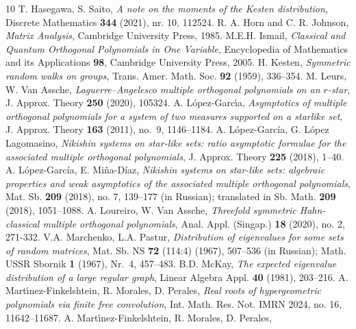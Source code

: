 \documentclass[12pt]{article}
\numberwithin{equation}{section}
\begin{document}
\begin{thebibliography}{10}
 T. Hasegawa, S. Saito,
\textit{A note on the moments of the Kesten distribution},
Discrete Mathematics \textbf{344} (2021), nr. 10, 112524.
 R. A. Horn  and C. R. Johnson, 
\textit{Matrix Analysis}, Cambridge University Press, 1985. 
 M.E.H. Ismail, \textit{Classical and Quantum Orthogonal Polynomials in One Variable},
Encyclopedia of Mathematics and its Applications \textbf{98}, Cambridge University Press,
2005.
 H. Kesten,
\textit{Symmetric random walks on groups},
Trans. Amer. Math. Soc. \textbf{92} (1959), 336--354.
 M. Leurs, W. Van Assche,
\textit{Laguerre--Angelesco multiple orthogonal polynomials on an $r$-star},
J. Approx. Theory \textbf{250} (2020), 105324.
 A. L\'opez-Garc\'\i a, 
\textit{Asymptotics of multiple orthogonal polynomials for a system of two measures supported on a starlike set}, 
J. Approx. Theory \textbf{163} (2011), no.~9, 1146--1184.
 A. L\'opez-Garc\'ia, G. L\'opez Lagomasino, 
\textit{Nikishin systems on star-like sets: ratio asymptotic formulae for the associated multiple orthogonal polynomials}, 
J. Approx. Theory \textbf{225} (2018), 1--40.
 A. L\'opez-Garc\'ia, E. Mi\~na-D\'iaz,
\textit{Nikishin systems on star-like sets: algebraic properties and weak asymptotics of the associated multiple orthogonal polynomials},
Mat. Sb.  \textbf{209}  (2018),  no. 7, 139--177 (in Russian);
translated in Sb. Math. \textbf{209} (2018), 1051--1088.
 A. Loureiro, W. Van Assche,
\textit{Threefold symmetric Hahn-classical multiple orthogonal polynomials}, Anal. Appl. (Singap.) \textbf{18} (2020), no. 2, 271-332.%
 V.A. Marchenko, L.A. Pastur,
\textit{Distribution of eigenvalues for some sets of random matrices},
Mat. Sb. NS \textbf{72} (114:4) (1967), 507--536 (in Russian);
Math. USSR Sbornik \textbf{1} (1967), Nr.~4, 457--483.
 B.D. McKay,
\textit{The expected eigenvalue distribution of a large regular graph},
Linear Algebra Appl. \textbf{40} (1981), 203--216.
 A. Mart\'\i nez-Finkelshtein, R. Morales, D. Perales,
\textit{Real roots of hypergeometric polynomials via finite free convolution},
Int. Math. Res. Not. IMRN 2024, no. 16, 11642--11687.
  A. Mart\'\i nez-Finkelshtein, R. Morales, D. Perales,

\end{thebibliography}
\end{document}
